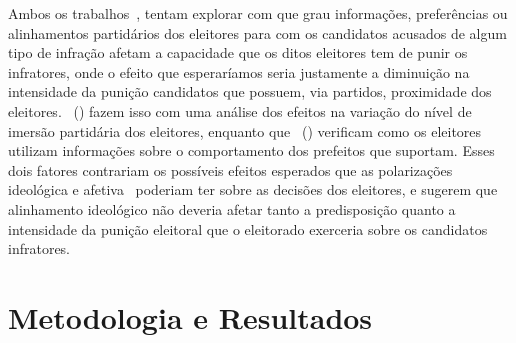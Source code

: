 \documentclass[
	12pt,				%
	openright,			%
	twoside,			%
	a4paper,			%
	openany,
	english,			%
	brazil				%
	]{abntex2}
\begin{document}
Ambos os trabalhos~\cite{Boas2019Apr, Botero2021Apr}, tentam explorar com que grau informações, preferências ou alinhamentos partidários dos eleitores para com os candidatos acusados de algum tipo de infração afetam a capacidade que os ditos eleitores tem de punir os infratores, onde o efeito que esperaríamos seria justamente a diminuição na intensidade da punição candidatos que possuem, via partidos, proximidade dos eleitores. ~(\citeyear{Botero2021Apr}) fazem isso com uma análise dos efeitos na variação do nível de imersão partidária dos eleitores, enquanto que ~(\citeyear{Boas2019Apr}) verificam como os eleitores utilizam informações sobre o comportamento dos prefeitos que suportam. Esses dois fatores contrariam os possíveis efeitos esperados que as polarizações ideológica e afetiva~\cite{fuks2020afeto} poderiam ter sobre as decisões dos eleitores, e sugerem que alinhamento ideológico não deveria afetar tanto a predisposição quanto a intensidade da punição eleitoral que o eleitorado exerceria sobre os candidatos infratores.


\chapter{Metodologia e Resultados}


\end{document}
